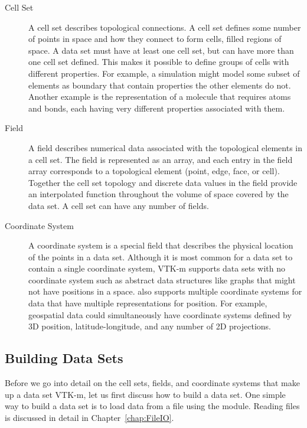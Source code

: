 \begin{description}
\item[Cell Set]  A cell set describes topological
  connections. A cell set defines some number of points in space and how
  they connect to form cells, filled regions of space. A data set must have
  at least one cell set, but can have more than one cell set defined. This
  makes it possible to define groups of cells with different properties.
  For example, a simulation might model some subset of elements as boundary
  that contain properties the other elements do not. Another example is the
  representation of a molecule that requires atoms and bonds, each having
  very different properties associated with them.
\item[Field]  A field describes numerical data associated with
  the topological elements in a cell set. The field is represented as an
  array, and each entry in the field array corresponds to a topological
  element (point, edge, face, or cell). Together the cell set topology and
  discrete data values in the field provide an interpolated function
  throughout the volume of space covered by the data set. A cell set can
  have any number of fields.
\item[Coordinate System]  A coordinate system is a
  special field that describes the physical location of the points in a
  data set. Although it is most common for a data set to contain a single
  coordinate system, VTK-m supports data sets with no coordinate system
  such as abstract data structures like graphs that might not have
  positions in a space.  also supports multiple
  coordinate systems for data that have multiple representations for
  position. For example, geospatial data could simultaneously have
  coordinate systems defined by 3D position, latitude-longitude, and any
  number of 2D projections.
\end{description}

\subsection{Building Data Sets}
\label{sec:DataSets:Building}


Before we go into detail on the cell sets, fields, and coordinate systems
that make up a data set VTK-m, let us first discuss how to build a data
set. One simple way to build a data set is to load data from a file using
the \vtkmio{} module. Reading files is discussed in detail in
Chapter~\ref{chap:FileIO}.

